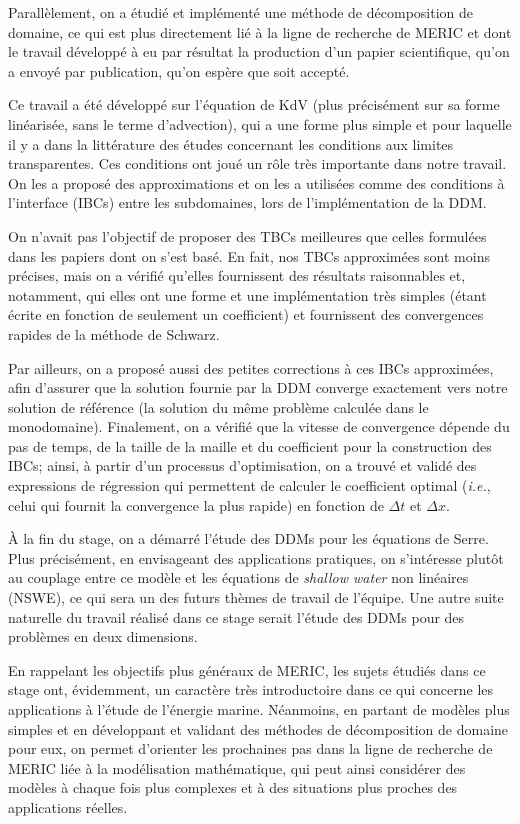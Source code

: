 \indent Parallèlement, on a étudié et implémenté une méthode de décomposition de domaine, ce qui est plus directement lié à la ligne de recherche de MERIC et dont le travail développé à eu par résultat la production d'un papier scientifique, qu'on a envoyé par publication, qu'on espère que soit accepté.

\indent Ce travail a été développé sur l'équation de KdV (plus précisément sur sa forme linéarisée, sans le terme d'advection), qui a une forme plus simple et pour laquelle il y a dans la littérature des études concernant les conditions aux limites transparentes. Ces conditions ont joué un rôle très importante dans notre travail. On les a proposé des approximations et on les a utilisées comme des conditions à l'interface (IBCs) entre les subdomaines, lors de l'implémentation de la DDM.

\indent On n'avait pas l'objectif de proposer des TBCs meilleures que celles formulées dans les papiers dont on s'est basé. En fait, nos TBCs approximées sont moins précises, mais on a vérifié qu'elles fournissent des résultats raisonnables et, notamment, qui elles ont une forme et une implémentation très simples (étant écrite en fonction de seulement un coefficient) et fournissent des convergences rapides de la méthode de Schwarz.

\indent Par ailleurs, on a proposé aussi des petites corrections à ces IBCs approximées, afin d'assurer que la solution fournie par la DDM converge exactement vers notre solution de référence (la solution du même problème calculée dans le monodomaine). Finalement, on a vérifié que la vitesse de convergence dépende du pas de temps, de la taille de la maille et du coefficient pour la construction des IBCs; ainsi, à partir d'un processus d'optimisation, on a trouvé et validé des expressions de régression qui permettent de calculer le coefficient optimal (\emph{i.e.}, celui qui fournit la convergence la plus rapide) en fonction de $\Delta t $ et $\Delta x$.

\indent À la fin du stage, on a démarré l'étude des DDMs pour les équations de Serre. Plus précisément, en envisageant des applications pratiques, on s'intéresse plutôt au couplage entre ce modèle et les équations de \emph{shallow water} non linéaires (NSWE), ce qui sera un des futurs thèmes de travail de l'équipe. Une autre suite naturelle du travail réalisé dans ce stage serait l'étude des DDMs pour des problèmes en deux dimensions.

\indent En rappelant les objectifs plus généraux de MERIC, les sujets étudiés dans ce stage ont, évidemment, un caractère très introductoire dans ce qui concerne les applications à l'étude de l'énergie marine. Néanmoins, en partant de modèles plus simples et en développant et validant des méthodes de décomposition de domaine pour eux, on permet d'orienter les prochaines pas dans la ligne de recherche de MERIC liée à la modélisation mathématique, qui peut ainsi considérer des modèles à chaque fois plus complexes et à des situations plus proches des applications réelles.